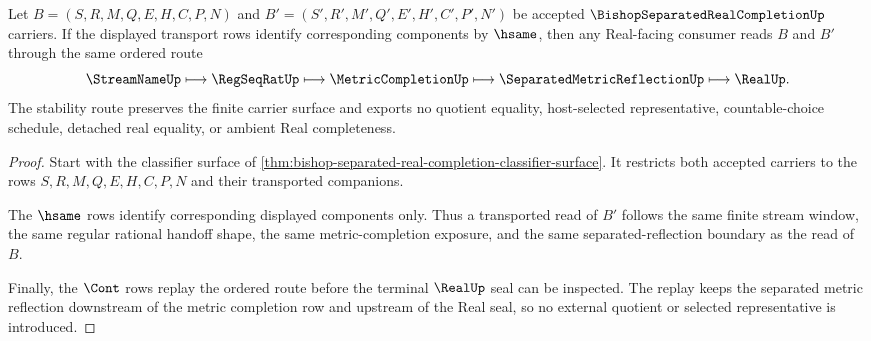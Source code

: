 \begin{theorem}
\label{thm:bishop-separated-real-completion-stability-route}
Let $B=(S,R,M,Q,E,H,C,P,N)$ and $B'=(S',R',M',Q',E',H',C',P',N')$ be accepted $\BishopSeparatedRealCompletionUp$ carriers. If the displayed transport rows identify corresponding components by $\hsame$, then any Real-facing consumer reads $B$ and $B'$ through the same ordered route
$$
\StreamNameUp \longmapsto \RegSeqRatUp \longmapsto \MetricCompletionUp \longmapsto \SeparatedMetricReflectionUp \longmapsto \RealUp .
$$
The stability route preserves the finite carrier surface and exports no quotient equality, host-selected representative, countable-choice schedule, detached real equality, or ambient Real completeness.
\end{theorem}
\begin{proof}
Start with the classifier surface of \autoref{thm:bishop-separated-real-completion-classifier-surface}. It restricts both accepted carriers to the rows $S,R,M,Q,E,H,C,P,N$ and their transported companions.

The $\hsame$ rows identify corresponding displayed components only. Thus a transported read of $B'$ follows the same finite stream window, the same regular rational handoff shape, the same metric-completion exposure, and the same separated-reflection boundary as the read of $B$.

Finally, the $\Cont$ rows replay the ordered route before the terminal $\RealUp$ seal can be inspected. The replay keeps the separated metric reflection downstream of the metric completion row and upstream of the Real seal, so no external quotient or selected representative is introduced.
\end{proof}

